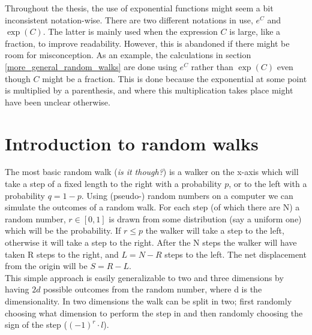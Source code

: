 Throughout the thesis, the use of exponential functions might seem a bit inconsistent notation-wise. 
There are two different notations in use, $e^C$ and $\exp(C)$. 
The latter is mainly used when the expression $C$ is large, like a fraction, to improve readability. 
However, this is abandoned if there might be room for misconception. 
As an example, the calculations in section \ref{more_general_random_walks} are done using $e^C$ rather than $\exp(C)$ even though $C$ might be a fraction.
This is done because the exponential at some point is multiplied by a parenthesis, and where this multiplication takes place might have been unclear otherwise.

\section{Introduction to random walks}\label{introduction_to_random_walks}

The most basic random walk (\emph{is it though?}) is a walker on the x-axis which will take a step of a fixed length to the right with a probability $p$, or to the left with a probability $q=1-p$. 
Using (pseudo-) random numbers on a computer we can simulate the outcomes of a random walk. 
For each step (of which there are N) a random number, $r\in [0,1]$ is drawn from some distribution (say a uniform one) which will be the probability. 
If $r\leq p$ the walker will take a step to the left, otherwise it will take a step to the right. 
After the N steps the walker will have taken R steps to the right, and $L = N-R$ steps to the left. 
The net displacement from the origin will be $S = R-L$. \\
This simple approach is easily generalizable to two and three dimensions by having $2d$ possible outcomes from the random number, where d is the dimensionality. 
In two dimensions the walk can be split in two; first randomly choosing what dimension to perform the step in and then randomly choosing the sign of the step ($(-1)^r\cdot l$).

